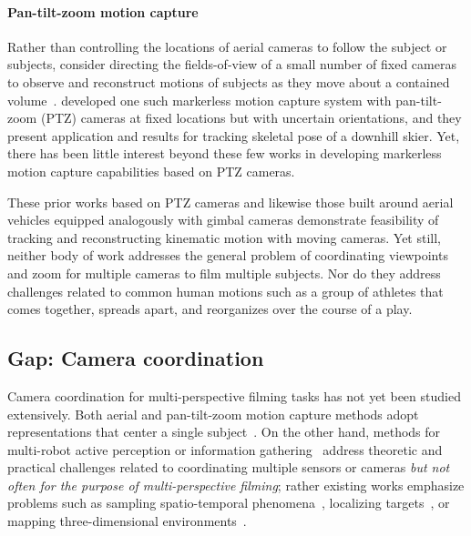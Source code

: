 \documentclass[11pt]{article}
\begin{document}

\paragraph{Pan-tilt-zoom motion capture}
Rather than controlling the locations of aerial cameras to follow the subject or
subjects, consider directing the fields-of-view of a small number of
fixed cameras to observe and reconstruct motions of subjects as they
move about a contained volume~\citep{bachmann20193dv,yamamoto2022visigrapp}.
\citet{bachmann20193dv} developed one such
markerless motion capture system with pan-tilt-zoom (PTZ) cameras at fixed
locations but with uncertain orientations, and they present application and
results for tracking skeletal pose of a downhill skier.
Yet, there has been little interest beyond these few works in developing
markerless motion capture capabilities based on PTZ cameras.

These prior works based on PTZ cameras and likewise those built around aerial
vehicles equipped analogously with gimbal cameras demonstrate feasibility of
tracking and reconstructing kinematic motion with moving cameras.
Yet still, neither body of work addresses the general problem of coordinating
viewpoints and zoom for multiple cameras to film multiple subjects.
Nor do they address challenges related to common human motions
such as a group of athletes that comes together, spreads apart, and reorganizes
over the course of a play.

\subsection{Gap: Camera coordination}

Camera coordination for multi-perspective filming tasks has not yet been
studied extensively.
Both aerial and pan-tilt-zoom motion capture methods adopt
representations that center a single
subject~\citep{ho2021iros,saini2022ral,saini2019iccv,hong2024eccv,zhou2018icra,bachmann20193dv,yamamoto2022visigrapp}.
On the other hand, methods for multi-robot active perception or information
gathering~\citep{singh2009,corah2019auro,atanasov2015icra} address theoretic and
practical challenges related to coordinating multiple sensors or cameras
\emph{but not often for the purpose of multi-perspective filming}; rather existing
works emphasize problems such as
sampling spatio-temporal phenomena~\citep{singh2009},
localizing targets~\cite{atanasov2015icra}, or
mapping three-dimensional environments~\citep{corah2019auro}.
\end{document}
